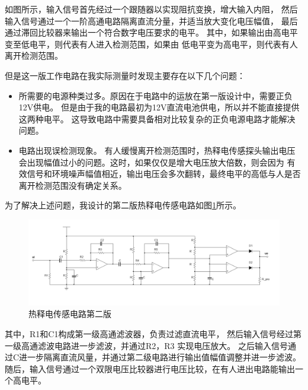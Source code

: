 \documentclass{article}
\begin{document}
\begin{spacing}{1.5}
\begin{enumerate}
        如图所示，输入信号首先经过一个跟随器以实现阻抗变换，增大输入内阻，
        然后输入信号通过一个一阶高通电路隔离直流分量，并适当放大变化电压幅值，
        最后通过滞回比较器来输出一个符合数字电压要求的电平。
        其中，如果输出由高电平变至低电平，则代表有人进入检测范围，如果由
        低电平变为高电平，则代表有人离开检测范围。

        但是这一版工作电路在我实际测量时发现主要存在以下几个问题：

        \begin{itemize}
            \item 所需要的电源种类过多。原因在于电路中的运放在第一版设计中，需要正负12V供电。
            但是由于我的电路最初为12V直流电池供电，所以并不能直接提供这两种电平。
            这导致电路中需要具备相对比较复杂的正负电源电路才能解决问题。
            
            \item 电路出现误检测现象。
            有人缓慢离开检测范围时，热释电传感探头输出电压会出现幅值过小的问题。这时，如果仅仅是增大电压放大倍数，则会因为
            有效信号和环境噪声幅值相近，输出电压会多次翻转，最终电平的高低与人是否离开检测范围没有确定关系。

        \end{itemize}

        为了解决上述问题，我设计的第二版热释电传感电路如图\ref{fig:design_prin_5}所示。

        \begin{figure}[H]
            \centering
            \includegraphics[scale=0.4]{fig/design/principle5.png}
            \caption{热释电传感电路第二版}
            \label{fig:design_prin_5}
        \end{figure}

        其中，R1和C1构成第一级高通滤波器，负责过滤直流电平，
        然后输入信号经过第一级高通滤波电路进一步滤波，并通过R2，R3
        实现电压放大。
        之后输入信号通过C进一步隔离直流风量，并通过第二级电路进行输出值幅值调整并进一步滤波。
        随后，输入信号通过一个双限电压比较器进行电压比较，在有人进出电路能输出一个高电平。


\end{enumerate}
\end{spacing}
\end{document}
